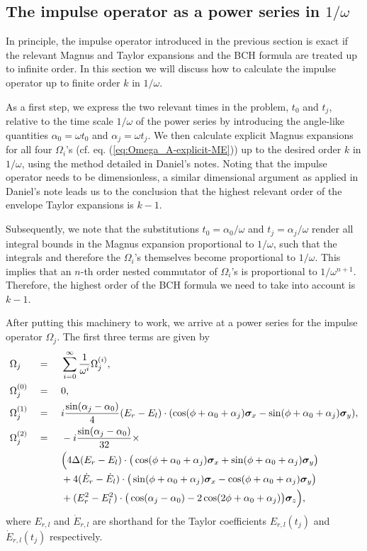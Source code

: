\subsection{The impulse operator as a power series in $1/\omega$}
In principle, the impulse operator introduced in the previous section is exact if the relevant Magnus and Taylor expansions and the BCH formula are treated up to infinite order. In this section we will discuss how to calculate the impulse operator up to finite order $k$ in $1/\omega$. 

As a first step, we express the two relevant times in the problem, $t_0$ and $t_j$, relative to the time scale $1/\omega$ of the power series by introducing the angle-like quantities $\alpha_0 = \omega t_0$ and $\alpha_j = \omega t_j$. We then calculate explicit Magnus expansions for all four $\Omega_i$'s (cf. eq. (\ref{eq:Omega_A-explicit-ME})) up to the desired order $k$ in $1/\omega$, using the method detailed in Daniel's notes. Noting that the impulse operator needs to be dimensionless, a similar dimensional argument as applied in Daniel's note leads us to the conclusion that the highest relevant order of the envelope Taylor expansions is $k-1$.

Subsequently, we note that the substitutions $t_0 = \alpha_0/\omega$ and $t_j = \alpha_j/\omega$ render all integral bounds in the Magnus expansion proportional to $1/\omega$, such that the integrals and therefore the $\Omega_i$'s themselves become proportional to $1/\omega$. This implies that an $n$-th order nested commutator of $\Omega_i$'s is proportional to $1/\omega^{n+1}$. Therefore, the highest order of the BCH formula we need to take into account is $k-1$.

After putting this machinery to work, we arrive at a power series for the impulse operator $\Omega_j$. The first three terms are given by
\begin{alignat}{3}
	&\Omega_j &&=\,\,&&\sum_{i=0}^\infty \frac{1}{\omega^i} \Omega_j^{(i)}, \\
	&\Omega_j^{(0)} && = &&0, \label{eq:Omega_j-ww-0} \\
	&\Omega_j^{(1)} && = &&i\frac{\sin(\alpha_j - \alpha_0)}{4}(E_r-E_l)\cdot(\cos(\phi+\alpha_0+\alpha_j)\bm{\sigma}_x - \sin(\phi+\alpha_0+\alpha_j)\bm{\sigma}_y), \label{eq:Omega_j-ww-1} \\
	&\Omega_j^{(2)} && = &&-i\frac{\sin(\alpha_j - \alpha_0)}{32} \times \label{eq:Omega_j-ww-2} \\
	& && && \Big( 4\Delta(E_r - E_l) \cdot \big( \cos(\phi+\alpha_0+\alpha_j) \bm{\sigma}_x + \sin(\phi+\alpha_0+\alpha_j) \bm{\sigma}_y \big)\nonumber \\
	& && && + 4(\dot{E}_r - \dot{E}_l) \cdot \big( \sin(\phi+\alpha_0+\alpha_j) \bm{\sigma}_x - \cos(\phi+\alpha_0+\alpha_j) \bm{\sigma}_y \big) \nonumber \\
	& && && + (E_r^2-E_l^2) \cdot \big(\cos(\alpha_j - \alpha_0) - 2\cos(2\phi+\alpha_0+\alpha_j)\big)\bm{\sigma}_z \Big), \nonumber 
\end{alignat}
where $E_{r,l}$ and $\dot{E}_{r,l}$ are shorthand for the Taylor coefficients $E_{r,l}(t_j)$ and $\dot{E}_{r,l}(t_j)$ respectively.

